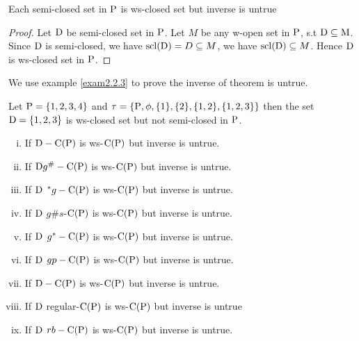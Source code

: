 \begin{thm}\label{thm2.2.2}
Each semi-closed set in $\mathrm{P}$ is ws-closed set but inverse is untrue
\end{thm}

\begin{proof}
Let $\mathrm{D}$ be semi-closed set in $\mathrm{P}$. Let $M$ be any w-open set in $\mathrm{P}$, s.t $\mathrm{D}\subseteq \mathrm{M}$. Since $\mathrm{D}$ is semi-closed, we have $\mathrm{scl}(\mathrm{D}) = D \subseteq M$, we have  $\mathrm{scl}(\mathrm{D}) \subseteq M$.   Hence $\mathrm{D}$ is ws-closed set in $\mathrm{P}$.
\end{proof}

We use example \ref{exam2.2.3} to prove the inverse of  theorem is untrue. 

\begin{exm}\label{exam2.2.3}
Let $\mathrm{P}= \{1, 2, 3, 4\}$ and  $\tau= \{\mathrm{P}, \phi, \{1\}, \{2\},\{1, 2\}, \{1, 2, 3\}\}$ then the set $\mathrm{D}= \{1,2,3\}$ is ws-closed set but not semi-closed in $\mathrm{P}$.  
\end{exm}

\begin{thm}\label{thm2.2.4}
\begin{enumerate}[(i)]
\item If $\mathrm{D}-\mathrm{C}(\mathrm{P})$ is ws-$\mathrm{C}(\mathrm{P})$ but inverse is untrue.

\item If $\mathrm{D} g^{\#}-\mathrm{C}(\mathrm{P})$ is ws-$\mathrm{C}(\mathrm{P})$ but inverse is untrue.

\item If $\mathrm{D}$ ${}^{*}g-\mathrm{C}(\mathrm{P})$ is ws-$\mathrm{C}(\mathrm{P})$ but inverse is untrue.

\item If $\mathrm{D}$ $g\# s$-$\mathrm{C}(\mathrm{P})$ is ws-$\mathrm{C}(\mathrm{P})$ but inverse is untrue. 

\item If $\mathrm{D}$ $g^{*}-\mathrm{C}(\mathrm{P})$ is ws-$\mathrm{C}(\mathrm{P})$ but inverse is untrue.

\item If $\mathrm{D}$ $gp-\mathrm{C}(\mathrm{P})$ is ws-$\mathrm{C}(\mathrm{P})$ but inverse is untrue.

\item If $\mathrm{D}-\mathrm{C}(\mathrm{P})$ is ws-$\mathrm{C}(\mathrm{P})$ but inverse is untrue.

\item If $\mathrm{D}$ regular-$\mathrm{C}(\mathrm{P})$ is ws-$\mathrm{C}(\mathrm{P})$ but inverse is untrue

\item If $\mathrm{D}$ $rb-\mathrm{C}(\mathrm{P})$ is ws-$\mathrm{C}(\mathrm{P})$ but inverse is untrue.
\end{enumerate}
\end{thm}

